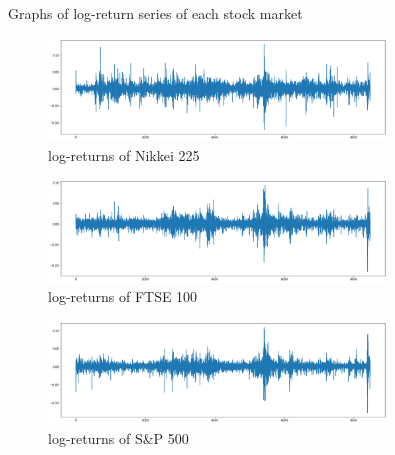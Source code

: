 \documentclass[a4paper,11pt,oneside]{book}
\begin{document}
\begin{appendix}
		\chapter{}
	
	Graphs of log-return series of each stock market	
	
\begin{figure}[!h]
		\centering
		\includegraphics[width=0.8\textwidth]{figures/logNikkei}
		\caption{log-returns of Nikkei 225}
		\label{logNikkei}
\end{figure}
		
\begin{figure}[!h]
		\centering
		\includegraphics[width=0.8\textwidth]{figures/logFTSE}
		\caption{log-returns of FTSE 100}
		\label{logFTSE}
\end{figure}
		
		
\begin{figure}[!h]
		\centering
		\includegraphics[width=0.8\textwidth]{figures/logS&P500}
		\caption{log-returns of S\&P 500}
		\label{logSandP 500}
\end{figure}

	\chapter{}


\end{appendix}
\end{document}
